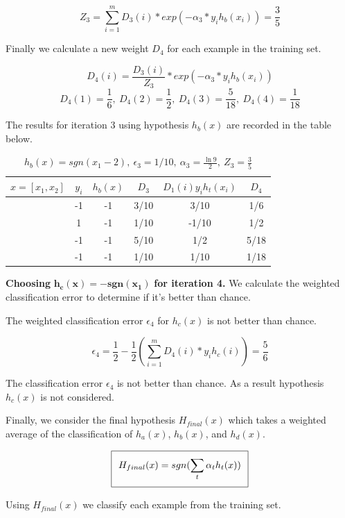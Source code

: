 \documentclass[11pt]{article}
\begin{document}
$$Z_3 = \sum_{i = 1}^m D_3(i) * exp(-\alpha_3 * y_ih_b(x_i)) = \frac{3}{5}$$

Finally we calculate a new weight $D_4$ for each example in the training set.

$$D_{4}(i) = \frac{D_3(i)}{Z_3} * exp(-\alpha_3 * y_ih_b(x_i))$$
$$D_4(1) = \frac{1}{6}, \ D_4(2) = \frac{1}{2}, \ D_4(3) = \frac{5}{18}, \ D_4(4) = \frac{1}{18} $$

The results for iteration 3 using hypothesis $h_b(x)$ are recorded in the table below.

\begin{table}[H]
\centering
{\renewcommand{\arraystretch}{1.2}%
\begin{tabular}{| c | c | c | c | c | c |}
\hline
$x = [x_1, x_2]$& $y_i$ & $h_b(x)$ & $D_3$ & $D_1(i)y_ih_t(x_i)$ & $D_4$\\
\hline
[1,1] & -1 & -1&  3/10&  3/10& 1/6\\ \hline
[1,-1] & 1 &  -1&  1/10&  -1/10& 1/2\\ \hline
[-1,-1] & -1 & -1 & 5/10&  1/2& 5/18\\ \hline
[-1,1] & -1 &  -1&  1/10&  1/10& 1/18\\ \hline
\end{tabular}}
\caption{$h_b(x) = sgn(x_1 - 2), \ \epsilon_3 = 1/10, \ \alpha_3 = \frac{\ln9}{2}, \ Z_3 = \frac{3}{5}$}
\end{table}

\textbf{Choosing} $\mathbf{h_c(x) = -sgn(x_1)}$ \textbf{for iteration 4.} We calculate the weighted classification error to determine if it's better than chance.

The weighted classification error $\epsilon_4$ for $h_c(x)$ is not better than chance.

$$\epsilon_4 = \frac{1}{2} - \frac{1}{2}(\sum_{i=1}^m D_4(i)*y_ih_c(i)) = \frac{5}{6}$$

The classification error $\epsilon_4$ is not better than chance. As a result hypothesis $h_c(x)$ is not considered.

Finally, we consider the final hypothesis $H_{final}(x)$ which takes a weighted average of the classification of $h_a(x)$, $h_b(x)$, and $h_d(x)$.

\begin{equation}
\setlength\fboxsep{0.25cm}
\setlength\fboxrule{0.4pt}
\boxed{H_{final}(x) = sgn(\sum_{t}\alpha_th_t(x))}
\end{equation}

Using $H_{final}(x)$ we classify each example from the training set.
\end{document}
